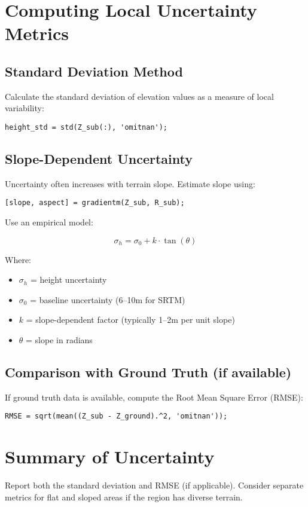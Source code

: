 \documentclass{article}
\begin{document}
\section{Computing Local Uncertainty Metrics}
\subsection{Standard Deviation Method}
Calculate the standard deviation of elevation values as a measure of local variability:

\begin{verbatim}
height_std = std(Z_sub(:), 'omitnan');
\end{verbatim}

\subsection{Slope-Dependent Uncertainty}
Uncertainty often increases with terrain slope. Estimate slope using:

\begin{verbatim}
[slope, aspect] = gradientm(Z_sub, R_sub);
\end{verbatim}

Use an empirical model:

\begin{equation}
\sigma_h = \sigma_0 + k \cdot \tan(\theta)
\end{equation}

Where:
\begin{itemize}
    \item $\sigma_h$ = height uncertainty
    \item $\sigma_0$ = baseline uncertainty (6–10m for SRTM)
    \item $k$ = slope-dependent factor (typically 1–2m per unit slope)
    \item $\theta$ = slope in radians
\end{itemize}

\subsection{Comparison with Ground Truth (if available)}
If ground truth data is available, compute the Root Mean Square Error (RMSE):

\begin{verbatim}
RMSE = sqrt(mean((Z_sub - Z_ground).^2, 'omitnan'));
\end{verbatim}

\section{Summary of Uncertainty}
Report both the standard deviation and RMSE (if applicable). Consider separate metrics for flat and sloped areas if the region has diverse terrain.
\end{document}
